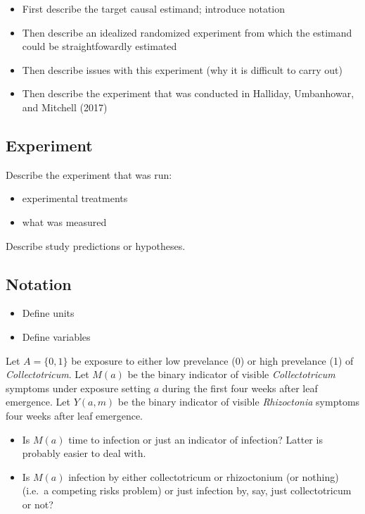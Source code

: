 \documentclass[]{article}
\providecommand{\tightlist}{%
  \setlength{\itemsep}{0pt}\setlength{\parskip}{0pt}}
\begin{document}
\begin{itemize}
\tightlist
\item
  First describe the target causal estimand; introduce notation
\item
  Then describe an idealized randomized experiment from which the
  estimand could be straightfowardly estimated
\item
  Then describe issues with this experiment (why it is difficult to
  carry out)
\item
  Then describe the experiment that was conducted in Halliday,
  Umbanhowar, and Mitchell (2017)
\end{itemize}

\hypertarget{experiment}{%
\subsection{Experiment}\label{experiment}}

Describe the experiment that was run:

\begin{itemize}
\tightlist
\item
  experimental treatments
\item
  what was measured
\end{itemize}

Describe study predictions or hypotheses.

\hypertarget{notation}{%
\subsection{Notation}\label{notation}}

\begin{itemize}
\tightlist
\item
  Define units
\item
  Define variables
\end{itemize}

Let \(A = \{0, 1\}\) be exposure to either low prevelance (0) or high
prevelance (1) of \emph{Collectotricum}. Let \(M(a)\) be the binary
indicator of visible \emph{Collectotricum} symptoms under exposure
setting \(a\) during the first four weeks after leaf emergence. Let
\(Y(a, m)\) be the binary indicator of visible \emph{Rhizoctonia}
symptoms four weeks after leaf emergence.

\begin{itemize}
\tightlist
\item
  Is \(M(a)\) time to infection or just an indicator of infection?
  Latter is probably easier to deal with.
\item
  Is \(M(a)\) infection by either collectotricum or rhizoctonium (or
  nothing) (i.e.~a competing risks problem) or just infection by, say,
  just collectotricum or not?
\end{itemize}
\end{document}
